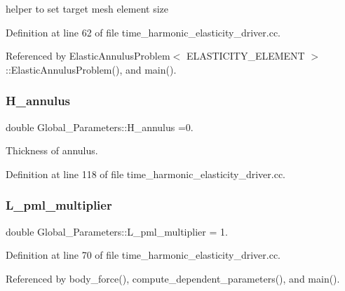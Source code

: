 helper to set target mesh element size 



Definition at line 62 of file time\+\_\+harmonic\+\_\+elasticity\+\_\+driver.\+cc.



Referenced by Elastic\+Annulus\+Problem$<$ E\+L\+A\+S\+T\+I\+C\+I\+T\+Y\+\_\+\+E\+L\+E\+M\+E\+N\+T $>$\+::\+Elastic\+Annulus\+Problem(), and main().

\mbox{\label{namespaceGlobal__Parameters_a0b73c5ead1114ae88bbd4cb0eb54f078}} 
\subsubsection{\texorpdfstring{H\+\_\+annulus}{H\_annulus}}
{\footnotesize\ttfamily double Global\+\_\+\+Parameters\+::\+H\+\_\+annulus =0.}



Thickness of annulus. 



Definition at line 118 of file time\+\_\+harmonic\+\_\+elasticity\+\_\+driver.\+cc.

\mbox{\label{namespaceGlobal__Parameters_a7a49a7bc4052082ccf10caf8ff7a52b6}} 
\subsubsection{\texorpdfstring{L\+\_\+pml\+\_\+multiplier}{L\_pml\_multiplier}}
{\footnotesize\ttfamily double Global\+\_\+\+Parameters\+::\+L\+\_\+pml\+\_\+multiplier = 1.}



Definition at line 70 of file time\+\_\+harmonic\+\_\+elasticity\+\_\+driver.\+cc.



Referenced by body\+\_\+force(), compute\+\_\+dependent\+\_\+parameters(), and main().

\mbox{\label{namespaceGlobal__Parameters_a9af8f57814ac363b52f2a88d75864524}} 

